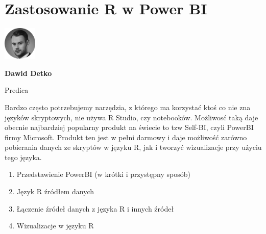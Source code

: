 \documentclass[\main/boa.tex]{subfiles}
\begin{document}
\section{Zastosowanie R w Power BI}
\begin{minipage}[t]{0.915\textwidth}
	\center     
    \includegraphics[width=60px]{img/workshops/czarno_biale/ddetko-crop.png} 
\end{minipage}

\begin{minipage}{0.915\textwidth}
\centering
{\bf {} Dawid Detko}
\end{minipage}

\vskip 0.3cm

\begin{affiliations}
\begin{minipage}{0.915\textwidth}
\centering
\large Predica  \\[2pt]
\end{minipage}
\end{affiliations}

\vskip 0.8cm

\opiswarsztatu Bardzo często potrzebujemy narzędzia, z którego ma korzystać ktoś co nie zna języków skryptowych, nie używa R Studio, czy notebooków. Możliwosć taką daje obecnie najbardziej popularny produkt na świecie to tzw Self-BI, czyli PowerBI firmy Microsoft. Produkt ten jest w pełni darmowy i daje możliwość zarówno pobierania danych ze skryptów w języku R, jak i tworzyć wizualizacje przy użyciu tego języka.

\planwarsztatu
\begin{enumerate}
\item Przedstawienie PowerBI (w krótki i przystępny sposób)
\item Język R źródłem danych
\item Łączenie źródeł danych z języka R i innych źródeł
\item Wizualizacje w języku R
\end{enumerate}	 
\end{document}
